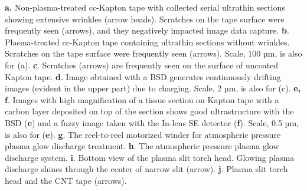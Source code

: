 \documentclass{article}
\begin{document}
\textbf{a.} Non-plasma-treated cc-Kapton tape with collected serial ultrathin sections showing extensive wrinkles (arrow heads). Scratches on the tape surface were frequently seen (arrows), and they negatively impacted image data capture. \textbf{b}. Plasma-treated cc-Kapton tape containing ultrathin sections without wrinkles. Scratches on the tape surface were frequently seen (arrows). Scale, 100 µm, is also for (a). \textbf{c}. Scratches (arrows) are frequently seen on the surface of uncoated Kapton tape. \textbf{d}. Image obtained with a BSD generates continuously drifting images (evident in the upper part) due to charging. Scale, 2 µm, is also for (c). \textbf{e, f}. Images with high magnification of a tissue section on Kapton 
tape with a carbon layer deposited on top of the section shows good ultrastructure with the BSD (\textbf{e}) and a fuzzy image taken with the In-lens SE detector (\textbf{f}). Scale, 0.5 µm, is also for (\textbf{e}). \textbf{g}. The reel-to-reel motorized winder for atmospheric pressure plasma glow discharge treatment. \textbf{h}. The atmospheric pressure plasma glow discharge system. \textbf{i}. Bottom view of the plasma slit torch head. Glowing plasma discharge shines through the center of narrow slit (arrow). \textbf{j}. Plasma slit torch head and the CNT tape (arrows).
\end{document}
